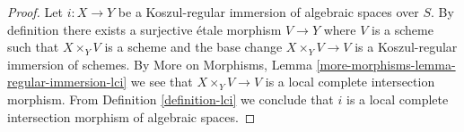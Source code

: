 \documentclass[10pt,a4paper]{amsart}
\theoremstyle{plain}
\theoremstyle{definition}
\theoremstyle{remark}
\numberwithin{equation}{subsection}
\begin{document}
\begin{proof}
Let $i : X \to Y$ be a Koszul-regular immersion of algebraic spaces
over $S$. By definition there exists a surjective \'etale morphism
$V \to Y$ where $V$ is a scheme such that $X \times_Y V$ is a scheme
and the base change $X \times_Y V \to V$ is a Koszul-regular immersion of
schemes. By More on Morphisms, Lemma
\ref{more-morphisms-lemma-regular-immersion-lci} we see that
$X \times_Y V \to V$ is a local complete intersection morphism.
From Definition \ref{definition-lci} we conclude that $i$ is a
local complete intersection morphism of algebraic spaces.
\end{proof}
\end{document}

